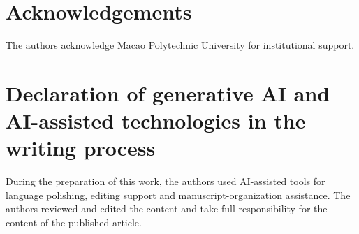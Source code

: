 \section*{Acknowledgements}
The authors acknowledge Macao Polytechnic University for institutional support.

\section*{Declaration of generative AI and AI-assisted technologies in the writing process}
During the preparation of this work, the authors used AI-assisted tools for language polishing, editing support and manuscript-organization assistance. The authors reviewed and edited the content and take full responsibility for the content of the published article.





